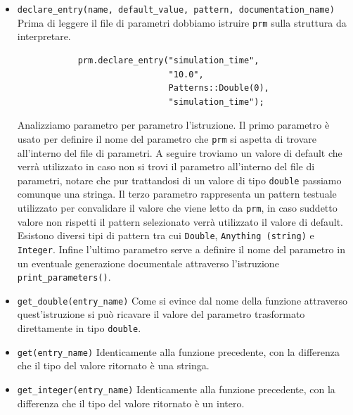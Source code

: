 \begin{itemize}
            \item \texttt{declare\_entry(name, default\_value, pattern, documentation\_name)}\newline
            Prima di leggere il file di parametri dobbiamo istruire \texttt{prm} sulla struttura da interpretare.
            \begin{verbatim}
            prm.declare_entry("simulation_time",
                              "10.0",
                              Patterns::Double(0),
                              "simulation_time");
            \end{verbatim}
            Analizziamo parametro per parametro l'istruzione. Il primo parametro è usato per definire il nome del parametro che \texttt{prm} si aspetta di trovare all'interno del file
            di parametri. A seguire troviamo un valore di default che verrà utilizzato in caso non si trovi il parametro all'interno del file di parametri, notare che pur trattandosi
            di un valore di tipo \texttt{double} passiamo comunque una stringa. Il terzo parametro rappresenta un pattern testuale utilizzato per convalidare il valore che viene letto
            da \texttt{prm}, in caso suddetto valore non rispetti il pattern selezionato verrà utilizzato il valore di default. Esistono diversi tipi di pattern tra cui \texttt{Double},
            \texttt{Anything (string)} e \texttt{Integer}. Infine l'ultimo parametro serve a definire il nome del parametro in un eventuale generazione documentale attraverso l'istruzione
            \texttt{print\_parameters()}.
            \item \texttt{get\_double(entry\_name)} \newline
            Come si evince dal nome della funzione attraverso quest'istruzione si può ricavare il valore del parametro trasformato direttamente in tipo \texttt{double}.
            \item \texttt{get(entry\_name)}\newline
            Identicamente alla funzione precedente, con la differenza che il tipo del valore ritornato è una stringa.
            \item \texttt{get\_integer(entry\_name)}\newline
            Identicamente alla funzione precedente, con la differenza che il tipo del valore ritornato è un intero.
            \end{itemize}

